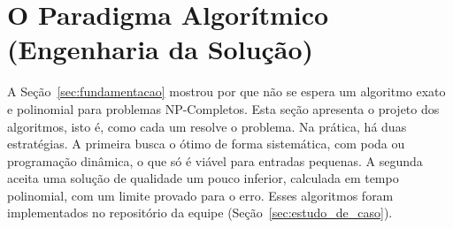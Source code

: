 \documentclass[conference]{IEEEtran}
\theoremstyle{definition}
\theoremstyle{plain}
\begin{document}
\begin{table}[htbp]
\centering
\caption{Tempo estimado para $10^9\text{ op/s}$ em diferentes complexidades.}
\label{tab:crescimento_combinatorio}
\end{table}

\section{O Paradigma Algorítmico (Engenharia da Solução)}
\label{sec:paradigma}

A Seção~\ref{sec:fundamentacao} mostrou por que não se espera um algoritmo exato e polinomial para problemas NP-Completos. Esta seção apresenta o projeto dos algoritmos, isto é, como cada um resolve o problema. Na prática, há duas estratégias. A primeira busca o ótimo de forma sistemática, com poda ou programação dinâmica, o que só é viável para entradas pequenas. A segunda aceita uma solução de qualidade um pouco inferior, calculada em tempo polinomial, com um limite provado para o erro. Esses algoritmos foram implementados no repositório da equipe (Seção~\ref{sec:estudo_de_caso}).
\end{document}
